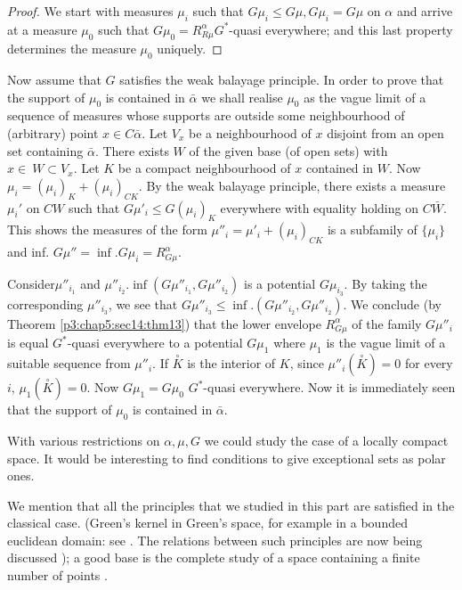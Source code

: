 \begin{proof}
  We start with measures  $\mu_i$ such that $G \mu_i \leq G \mu,   G
  \mu_i = G \mu$ on $\alpha$ and arrive at a measure $\mu_0$ such
  that $ G \mu_0 = R^\alpha_{R \mu} G^* $-quasi everywhere; and this
  last property determines the measure $\mu_0$ uniquely. 
\end{proof}

Now assume that $G$ satisfies the weak balayage principle. In order to
prove that the support of $\mu_0 $ is contained in $\bar{\alpha}$  we
shall realise $\mu_0$ as the vague limit of a sequence of measures
whose supports are outside some neighbourhood of  (arbitrary)  point $
x \in C \bar{\alpha} $. Let $V_x$ be a neighbourhood of $x$ disjoint
from an open set containing $\bar{\alpha}$. There exists $W$ of the
given base (of open sets) with $ x \in ~ W \subset V_x $. Let $K$ be
a compact neighbourhood of $x$ contained in $W$. Now $\mu_i =
(\mu_i)_K + (\mu_i)_{CK}$. By the weak balayage principle, there exists
a measure $\mu_i'$ on $ C W $ such that  $ G \mu'_i \leq G (\mu_i)_K $
everywhere with equality holding on $ C \bar{W}$. This shows the
measures of the form $ \mu''_i = \mu'_i + (\mu_i)_{CK} $ is a subfamily
of $ \big \{ \mu_i \big \} $ and inf. $ G \mu'' = \inf.  G \mu_i =
R^\alpha_{G \mu}$. 

Consider\pageoriginale $\mu''_{i_{1}}$ and $\mu''_{i_{2}}. \inf ( G \mu''_{i_{1}}, G
\mu''_{i_{2}} )$ is a potential $ G \mu_{i_{3}} $. By taking the
corresponding $\mu''_{i_{3}}$, we see that $G \mu''_{i_{3}} \leq \inf. 
( G \mu''_{i_{2}},  G \mu''_{i_{2}} )$. We conclude (by
Theorem \ref{p3:chap5:sec14:thm13})
that the  lower envelope $ R^\alpha_{G \mu} $ of the family $G \mu''_i
$ is equal $G^*$-quasi everywhere to a potential $ G \mu_1 $ where $
\mu_1 $ is the vague limit of a suitable sequence from $\mu''_i $. If $
\overset{\circ}{K} $ is  the interior of $K$, since $ \mu''_i (
\overset{\circ}{K} )  = 0 $ for every $ i$, $ \mu_1 ( \overset{\circ}{K}) = 0
$. Now $ G \mu_1 = G \mu_0 $ $G^*$-quasi everywhere. Now it is
immediately seen that the support of $ \mu_0 $ is contained in $
\bar{\alpha}$.  

\begin{remark*}
  With various restrictions on $ \alpha,  \mu, G $ we could study the
  case of a locally compact space. It would be interesting to find
  conditions to give exceptional sets as  polar ones.  
\end{remark*}

We mention that all the principles that we studied in this part are
satisfied in the classical case. (Green's kernel in Green's space, for
example in a bounded euclidean domain:  see \cite{5}. The relations
between such principles are now being discussed \cite{14} ); a good base is
the complete study of a space containing a finite  number of points
\cite{10}. 

